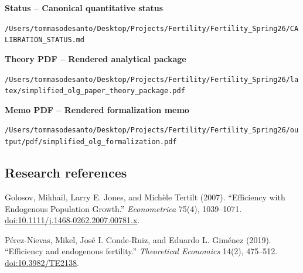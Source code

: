 \documentclass[11pt,letterpaper]{article}
\begin{document}
\hypertarget{source-status}{\textbf{Status -- Canonical quantitative status}}\par
{\small\nolinkurl{/Users/tommasodesanto/Desktop/Projects/Fertility/Fertility_Spring26/CALIBRATION_STATUS.md}}\par
\vspace{0.35em}

\hypertarget{source-package-pdf}{\textbf{Theory PDF -- Rendered analytical package}}\par
{\small\nolinkurl{/Users/tommasodesanto/Desktop/Projects/Fertility/Fertility_Spring26/latex/simplified_olg_paper_theory_package.pdf}}\par
\vspace{0.35em}

\hypertarget{source-memo-pdf}{\textbf{Memo PDF -- Rendered formalization memo}}\par
{\small\nolinkurl{/Users/tommasodesanto/Desktop/Projects/Fertility/Fertility_Spring26/output/pdf/simplified_olg_formalization.pdf}}\par
\vspace{0.35em}

\subsection*{Research references}
Golosov, Mikhail, Larry E. Jones, and Mich\`ele Tertilt (2007). ``Efficiency with Endogenous Population Growth.'' \emph{Econometrica} 75(4), 1039--1071. \href{https://doi.org/10.1111/j.1468-0262.2007.00781.x}{doi:10.1111/j.1468-0262.2007.00781.x}.

P\'erez-Nievas, Mikel, Jos\'e I. Conde-Ruiz, and Eduardo L. Gim\'enez (2019). ``Efficiency and endogenous fertility.'' \emph{Theoretical Economics} 14(2), 475--512. \href{https://doi.org/10.3982/TE2138}{doi:10.3982/TE2138}.
\end{document}
